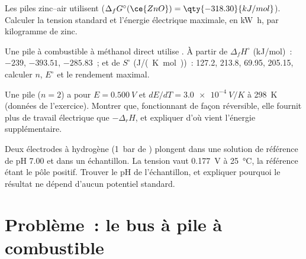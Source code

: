 \begin{exercise}[$\star\star$]\label{exo:b2:cell-thermodynamics:9}
Les piles zinc--air utilisent  ($\Delta_f G^\circ(\ce{ZnO}) =
\qty{-318.30}{kJ/mol}$). Calculer la tension standard et l'énergie électrique
maximale, en \unit{kW.h}, par kilogramme de zinc.
\end{exercise}

\begin{exercise}[$\star\star\star$]\label{exo:b2:cell-thermodynamics:10}
Une pile à combustible à méthanol direct utilise . À partir de
$\Delta_f H^\circ$ (\unit{kJ/mol})~:  $-239$,  $-393.51$,
 $-285.83$~; et de $S^\circ$ (\unit{J/(K.mol)})~:  127.2,
 213.8,  69.95,  205.15, calculer $n$, $E^\circ$ et le
rendement maximal.
\end{exercise}

\begin{exercise}[$\star\star\star$]\label{exo:b2:cell-thermodynamics:11}
Une pile ($n = 2$) a pour $E = \qty{0.500}{V}$ et $dE/dT = \qty{+3.0e-4}{V/K}$ à
\qty{298}{K} (données de l'exercice). Montrer que, fonctionnant de façon réversible, elle fournit plus de
travail électrique que $-\Delta_r H$, et expliquer d'où vient l'énergie supplémentaire.
\end{exercise}

\begin{exercise}[$\star\star\star$]\label{exo:b2:cell-thermodynamics:12}
Deux électrodes à hydrogène (\qty{1}{bar} de ) plongent dans une solution de référence de
pH 7.00 et dans un échantillon. La tension vaut \qty{0.177}{V} à \qty{25}{\degreeCelsius},
la référence étant le pôle positif. Trouver le pH de l'échantillon, et expliquer
pourquoi le résultat ne dépend d'aucun potentiel standard.
\end{exercise}

\section{Problème~: le bus à pile à combustible}

